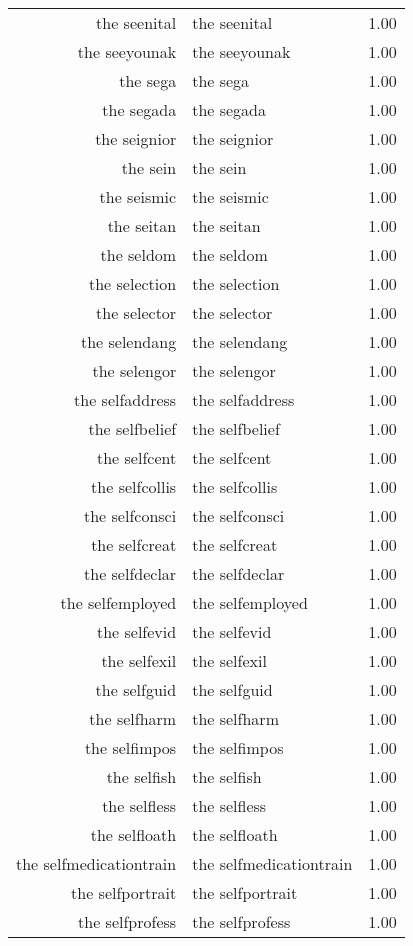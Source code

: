 \begin{table}[ht]
\begin{tabular}{rlr}
  the seenital & the seenital & 1.00 \\ 
  the seeyounak & the seeyounak & 1.00 \\ 
  the sega & the sega & 1.00 \\ 
  the segada & the segada & 1.00 \\ 
  the seignior & the seignior & 1.00 \\ 
  the sein & the sein & 1.00 \\ 
  the seismic & the seismic & 1.00 \\ 
  the seitan & the seitan & 1.00 \\ 
  the seldom & the seldom & 1.00 \\ 
  the selection & the selection & 1.00 \\ 
  the selector & the selector & 1.00 \\ 
  the selendang & the selendang & 1.00 \\ 
  the selengor & the selengor & 1.00 \\ 
  the selfaddress & the selfaddress & 1.00 \\ 
  the selfbelief & the selfbelief & 1.00 \\ 
  the selfcent & the selfcent & 1.00 \\ 
  the selfcollis & the selfcollis & 1.00 \\ 
  the selfconsci & the selfconsci & 1.00 \\ 
  the selfcreat & the selfcreat & 1.00 \\ 
  the selfdeclar & the selfdeclar & 1.00 \\ 
  the selfemployed & the selfemployed & 1.00 \\ 
  the selfevid & the selfevid & 1.00 \\ 
  the selfexil & the selfexil & 1.00 \\ 
  the selfguid & the selfguid & 1.00 \\ 
  the selfharm & the selfharm & 1.00 \\ 
  the selfimpos & the selfimpos & 1.00 \\ 
  the selfish & the selfish & 1.00 \\ 
  the selfless & the selfless & 1.00 \\ 
  the selfloath & the selfloath & 1.00 \\ 
  the selfmedicationtrain & the selfmedicationtrain & 1.00 \\ 
  the selfportrait & the selfportrait & 1.00 \\ 
  the selfprofess & the selfprofess & 1.00 \\ 

\end{tabular}
\end{table}
